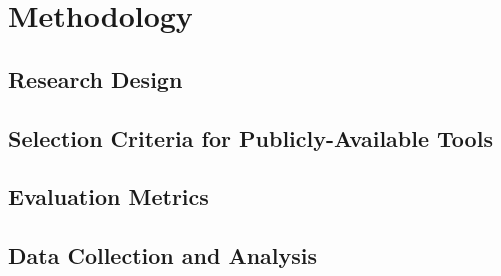 
\chapter{Methodology}\label{chapter:methodology}

\section{Research Design}\label{chapter:research}
\section{Selection Criteria for Publicly-Available Tools}\label{chapter:selection}
\section{Evaluation Metrics}\label{chapter:evaluation}
\section{Data Collection and Analysis}\label{chapter:data}